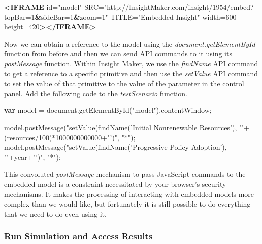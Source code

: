 \documentclass[]{memoir}
\newenvironment{Shaded}{}{}
\newcommand{\KeywordTok}[1]{\textcolor[rgb]{0.00,0.44,0.13}{\textbf{{#1}}}}
\newcommand{\DecValTok}[1]{\textcolor[rgb]{0.25,0.63,0.44}{{#1}}}
\newcommand{\StringTok}[1]{\textcolor[rgb]{0.25,0.44,0.63}{{#1}}}
\newcommand{\OtherTok}[1]{\textcolor[rgb]{0.00,0.44,0.13}{{#1}}}
\newcommand{\FunctionTok}[1]{\textcolor[rgb]{0.02,0.16,0.49}{{#1}}}
\newcommand{\ErrorTok}[1]{\textcolor[rgb]{1.00,0.00,0.00}{\textbf{{#1}}}}
\newcommand{\NormalTok}[1]{{#1}}
\begin{document}
\begin{Shaded}
\begin{Highlighting}[]
\KeywordTok{<IFRAME}\OtherTok{ id=}\StringTok{"model"}\OtherTok{ SRC=}\StringTok{"http://InsightMaker.com/insight/1954/embed?topBar=1}\ErrorTok{&}\StringTok{sideBar=1}\ErrorTok{&}\StringTok{zoom=1"}
\OtherTok{TITLE=}\StringTok{"Embedded Insight"}\OtherTok{ width=}\StringTok{600}\OtherTok{ height=}\StringTok{420}\KeywordTok{></IFRAME>} 
\end{Highlighting}
\end{Shaded}

Now we can obtain a reference to the model using the
\emph{document.getElementById} function from before and then we can send
API commands to it using its \emph{postMessage} function. Within Insight
Maker, we use the \emph{findName} API command to get a reference to a
specific primitive and then use the \emph{setValue} API command to set
the value of that primitive to the value of the parameter in the control
panel. Add the following code to the \emph{testScenario} function.

\begin{Shaded}
\begin{Highlighting}[]
\KeywordTok{var} \NormalTok{model = }\OtherTok{document}\NormalTok{.}\FunctionTok{getElementById}\NormalTok{(}\StringTok{"model"}\NormalTok{).}\FunctionTok{contentWindow}\NormalTok{;}

\OtherTok{model}\NormalTok{.}\FunctionTok{postMessage}\NormalTok{(}\StringTok{"setValue(findName('Initial Nonrenewable Resources'), '"}\NormalTok{+(resources/}\DecValTok{100}\NormalTok{)*}\DecValTok{1000000000000}\NormalTok{+}\StringTok{"')"}\NormalTok{, }\StringTok{"*"}\NormalTok{);}
\OtherTok{model}\NormalTok{.}\FunctionTok{postMessage}\NormalTok{(}\StringTok{"setValue(findName('Progressive Policy Adoption'), '"}\NormalTok{+year+}\StringTok{"')"}\NormalTok{, }\StringTok{"*"}\NormalTok{);}
\end{Highlighting}
\end{Shaded}

This convoluted \emph{postMessage} mechanism to pass JavaScript commands
to the embedded model is a constraint necessitated by your browser's
security mechanisms. It makes the processing of interacting with
embedded models more complex than we would like, but fortunately it is
still possible to do everything that we need to do even using it.

\subsubsection{Run Simulation and Access Results}
\end{document}
